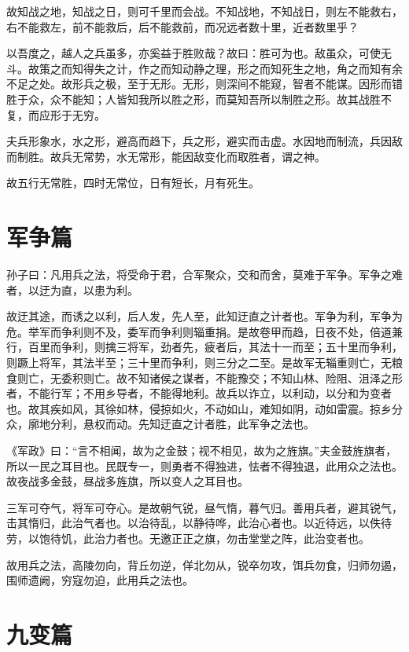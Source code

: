 \documentclass[UTF8]{ctexart}
\begin{document}
	故知战之地，知战之日，则可千里而会战。不知战地，不知战日，则左不能救右，右不能救左，前不能救后，后不能救前，而况远者数十里，近者数里乎？
	
	以吾度之，越人之兵虽多，亦奚益于胜败哉？故曰：胜可为也。敌虽众，可使无斗。故策之而知得失之计，作之而知动静之理，形之而知死生之地，角之而知有余不足之处。故形兵之极，至于无形。无形，则深间不能窥，智者不能谋。因形而错胜于众，众不能知；人皆知我所以胜之形，而莫知吾所以制胜之形。故其战胜不复，而应形于无穷。
	
	夫兵形象水，水之形，避高而趋下，兵之形，避实而击虚。水因地而制流，兵因敌而制胜。故兵无常势，水无常形，能因敌变化而取胜者，谓之神。
	
	故五行无常胜，四时无常位，日有短长，月有死生。
	
	\newpage
	\section{军争篇}
	
	孙子曰：凡用兵之法，将受命于君，合军聚众，交和而舍，莫难于军争。军争之难者，以迂为直，以患为利。
	
	故迂其途，而诱之以利，后人发，先人至，此知迂直之计者也。军争为利，军争为危。举军而争利则不及，委军而争利则辎重捐。是故卷甲而趋，日夜不处，倍道兼行，百里而争利，则擒三将军，劲者先，疲者后，其法十一而至；五十里而争利，则蹶上将军，其法半至；三十里而争利，则三分之二至。是故军无辎重则亡，无粮食则亡，无委积则亡。故不知诸侯之谋者，不能豫交；不知山林、险阻、沮泽之形者，不能行军；不用乡导者，不能得地利。故兵以诈立，以利动，以分和为变者也。故其疾如风，其徐如林，侵掠如火，不动如山，难知如阴，动如雷震。掠乡分众，廓地分利，悬权而动。先知迂直之计者胜，此军争之法也。
	
	《军政》曰：“言不相闻，故为之金鼓；视不相见，故为之旌旗。”夫金鼓旌旗者，所以一民之耳目也。民既专一，则勇者不得独进，怯者不得独退，此用众之法也。故夜战多金鼓，昼战多旌旗，所以变人之耳目也。
	
	三军可夺气，将军可夺心。是故朝气锐，昼气惰，暮气归。善用兵者，避其锐气，击其惰归，此治气者也。以治待乱，以静待哗，此治心者也。以近待远，以佚待劳，以饱待饥，此治力者也。无邀正正之旗，勿击堂堂之阵，此治变者也。
	
	故用兵之法，高陵勿向，背丘勿逆，佯北勿从，锐卒勿攻，饵兵勿食，归师勿遏，围师遗阙，穷寇勿迫，此用兵之法也。
	
	\newpage
	\section{九变篇}
	
\end{document}
